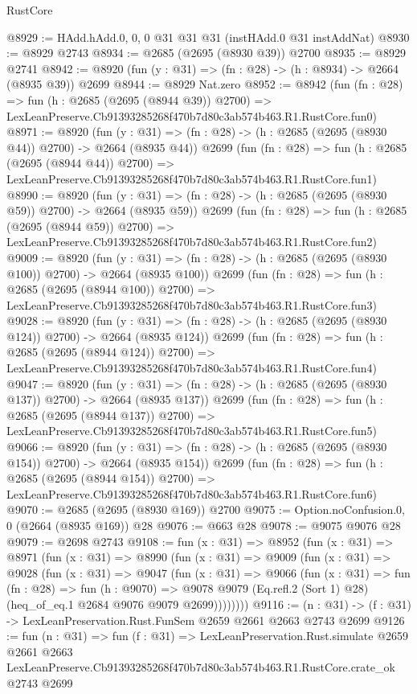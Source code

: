 \begin{lexlean}{RustCore}
\begin{coremodule}
@8929 := HAdd.hAdd.{0, 0, 0} @31 @31 @31 (instHAdd.{0} @31 instAddNat)
@8930 := @8929 @2743
@8934 := @2685 (@2695 (@8930 @39)) @2700
@8935 := @8929 @2741
@8942 := @8920 (fun (y : @31) => (fn : @28) -> (h : @8934) -> @2664 (@8935 @39)) @2699
@8944 := @8929 Nat.zero
@8952 := @8942
    (fun (fn : @28) =>
    fun (h : @2685 (@2695 (@8944 @39)) @2700) =>
    LexLeanPreserve.Cb91393285268f470b7d80c3ab574b463.R1.RustCore.fun0)
@8971 := @8920
    (fun (y : @31) => (fn : @28) -> (h : @2685 (@2695 (@8930 @44)) @2700) -> @2664 (@8935 @44))
    @2699
    (fun (fn : @28) =>
    fun (h : @2685 (@2695 (@8944 @44)) @2700) =>
    LexLeanPreserve.Cb91393285268f470b7d80c3ab574b463.R1.RustCore.fun1)
@8990 := @8920
    (fun (y : @31) => (fn : @28) -> (h : @2685 (@2695 (@8930 @59)) @2700) -> @2664 (@8935 @59))
    @2699
    (fun (fn : @28) =>
    fun (h : @2685 (@2695 (@8944 @59)) @2700) =>
    LexLeanPreserve.Cb91393285268f470b7d80c3ab574b463.R1.RustCore.fun2)
@9009 := @8920
    (fun (y : @31) => (fn : @28) -> (h : @2685 (@2695 (@8930 @100)) @2700) -> @2664 (@8935 @100))
    @2699
    (fun (fn : @28) =>
    fun (h : @2685 (@2695 (@8944 @100)) @2700) =>
    LexLeanPreserve.Cb91393285268f470b7d80c3ab574b463.R1.RustCore.fun3)
@9028 := @8920
    (fun (y : @31) => (fn : @28) -> (h : @2685 (@2695 (@8930 @124)) @2700) -> @2664 (@8935 @124))
    @2699
    (fun (fn : @28) =>
    fun (h : @2685 (@2695 (@8944 @124)) @2700) =>
    LexLeanPreserve.Cb91393285268f470b7d80c3ab574b463.R1.RustCore.fun4)
@9047 := @8920
    (fun (y : @31) => (fn : @28) -> (h : @2685 (@2695 (@8930 @137)) @2700) -> @2664 (@8935 @137))
    @2699
    (fun (fn : @28) =>
    fun (h : @2685 (@2695 (@8944 @137)) @2700) =>
    LexLeanPreserve.Cb91393285268f470b7d80c3ab574b463.R1.RustCore.fun5)
@9066 := @8920
    (fun (y : @31) => (fn : @28) -> (h : @2685 (@2695 (@8930 @154)) @2700) -> @2664 (@8935 @154))
    @2699
    (fun (fn : @28) =>
    fun (h : @2685 (@2695 (@8944 @154)) @2700) =>
    LexLeanPreserve.Cb91393285268f470b7d80c3ab574b463.R1.RustCore.fun6)
@9070 := @2685 (@2695 (@8930 @169)) @2700
@9075 := Option.noConfusion.{0, 0} (@2664 (@8935 @169)) @28
@9076 := @663 @28
@9078 := @9075 @9076 @28
@9079 := @2698 @2743
@9108 := fun (x : @31) =>
  @8952
    (fun (x : @31) =>
    @8971
      (fun (x : @31) =>
      @8990
        (fun (x : @31) =>
        @9009
          (fun (x : @31) =>
          @9028
            (fun (x : @31) =>
            @9047
              (fun (x : @31) =>
              @9066
                (fun (x : @31) =>
                fun (fn : @28) =>
                fun (h : @9070) =>
                @9078
                  @9079
                  (Eq.refl.{2} (Sort 1) @28)
                  (heq_of_eq.{1} @2684 @9076 @9079 @2699))))))))
@9116 := (n : @31) -> (f : @31) -> LexLeanPreservation.Rust.FunSem @2659 @2661 @2663 @2743 @2699
@9126 := fun (n : @31) =>
  fun (f : @31) =>
  LexLeanPreservation.Rust.simulate
    @2659
    @2661
    @2663
    LexLeanPreserve.Cb91393285268f470b7d80c3ab574b463.R1.RustCore.crate_ok
    @2743
    @2699
\end{coremodule}
\end{lexlean}
